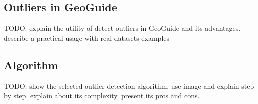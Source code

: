 \subsection{Outliers in GeoGuide}

TODO: explain the utility of detect outliers in GeoGuide and its advantages. describe a practical usage with real datasets examples

\subsection{Algorithm}

TODO: show the selected outlier detection algorithm. use image and explain step by step. explain about its complexity. present its pros and cons.